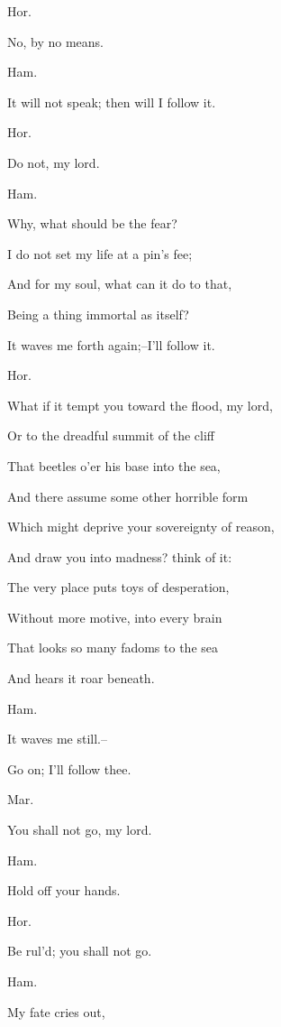 \documentclass[12pt]{book}
\begin{document}
Hor.

No, by no means.



Ham.

It will not speak; then will I follow it.



Hor.

Do not, my lord.



Ham.

Why, what should be the fear?

I do not set my life at a pin's fee;

And for my soul, what can it do to that,

Being a thing immortal as itself?

It waves me forth again;--I'll follow it.



Hor.

What if it tempt you toward the flood, my lord,

Or to the dreadful summit of the cliff

That beetles o'er his base into the sea,

And there assume some other horrible form

Which might deprive your sovereignty of reason,

And draw you into madness? think of it:

The very place puts toys of desperation,

Without more motive, into every brain

That looks so many fadoms to the sea

And hears it roar beneath.



Ham.

It waves me still.--

Go on; I'll follow thee.



Mar.

You shall not go, my lord.



Ham.

Hold off your hands.



Hor.

Be rul'd; you shall not go.



Ham.

My fate cries out,
\end{document}
